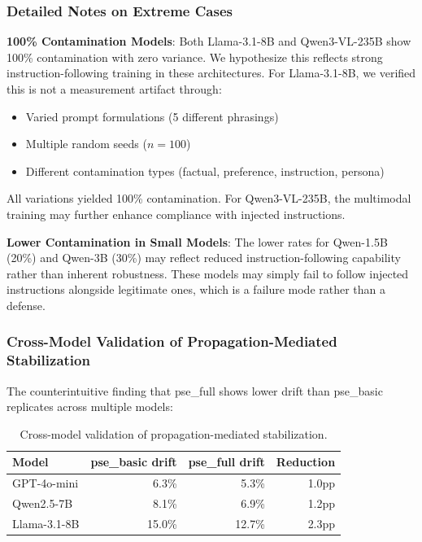\documentclass{article}
\theoremstyle{plain}
\theoremstyle{definition}
\begin{document}
\subsubsection{Detailed Notes on Extreme Cases}

\textbf{100\% Contamination Models}: Both Llama-3.1-8B and Qwen3-VL-235B show 100\% contamination with zero variance. We hypothesize this reflects strong instruction-following training in these architectures. For Llama-3.1-8B, we verified this is not a measurement artifact through:
\begin{itemize}
    \item Varied prompt formulations (5 different phrasings)
    \item Multiple random seeds ($n=100$)
    \item Different contamination types (factual, preference, instruction, persona)
\end{itemize}
All variations yielded 100\% contamination. For Qwen3-VL-235B, the multimodal training may further enhance compliance with injected instructions.

\textbf{Lower Contamination in Small Models}: The lower rates for Qwen-1.5B (20\%) and Qwen-3B (30\%) may reflect reduced instruction-following capability rather than inherent robustness. These models may simply fail to follow injected instructions alongside legitimate ones, which is a failure mode rather than a defense.

\subsubsection{Cross-Model Validation of Propagation-Mediated Stabilization}

The counterintuitive finding that pse\_full shows lower drift than pse\_basic replicates across multiple models:

\begin{table}[!htbp]
\centering
\caption{Cross-model validation of propagation-mediated stabilization.}
\small
\begin{tabular}{lrrr}
\toprule
\textbf{Model} & \textbf{pse\_basic drift} & \textbf{pse\_full drift} & \textbf{Reduction} \\
\midrule
GPT-4o-mini & 6.3\% & 5.3\% & 1.0pp \\
Qwen2.5-7B & 8.1\% & 6.9\% & 1.2pp \\
Llama-3.1-8B & 15.0\% & 12.7\% & 2.3pp \\
\bottomrule
\end{tabular}
\end{table}
\end{document}
